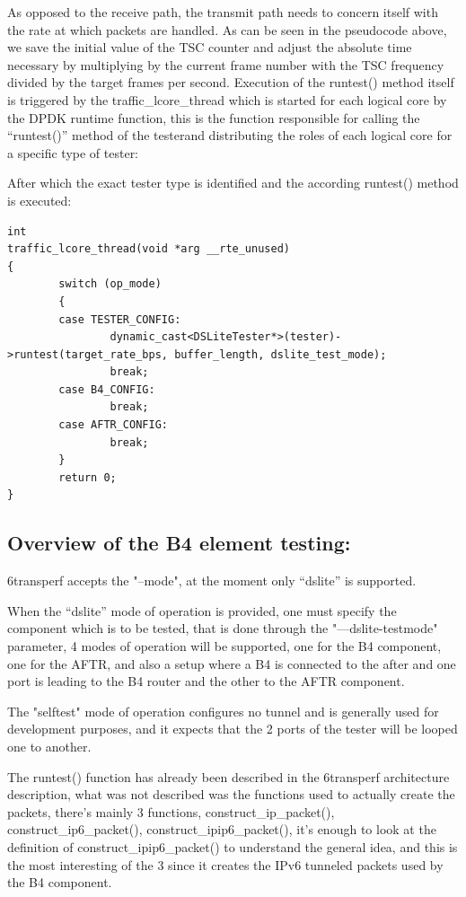 \documentclass[a4paper,12p]{article}
\begin{document}
	As opposed to the receive path, the transmit path needs to concern itself with the rate at which packets are handled. As can be seen in the pseudocode above, we save the initial value of the TSC counter and adjust the absolute time necessary by multiplying by the current frame number with the TSC frequency divided by the target frames per second.
	Execution of the runtest() method itself is triggered by the traffic\_lcore\_thread which is started for each logical core by the DPDK runtime function, this is the function responsible for calling the “runtest()” method of the testerand distributing the roles of each logical core for a specific type of tester:
 
After which the exact tester type is identified and the according runtest() method is executed:

\begin{lstlisting}
int
traffic_lcore_thread(void *arg __rte_unused)
{
        switch (op_mode)
        {
        case TESTER_CONFIG:
                dynamic_cast<DSLiteTester*>(tester)->runtest(target_rate_bps, buffer_length, dslite_test_mode);
                break;
        case B4_CONFIG:
                break;
        case AFTR_CONFIG:
                break;
        }
        return 0;
}
\end{lstlisting}

\subsection{Overview of the B4 element testing:}

6transperf accepts the "--mode", at the moment only “dslite” is supported.

When the “dslite” mode of operation is provided, one must specify the component which is to be tested, that is done through the "—dslite-testmode" parameter,  4 modes of operation will be supported, one for the B4 component, one for the AFTR, and also a setup where a B4 is connected to the after and one port is leading to the B4 router and the other to the AFTR component.

The "selftest" mode of operation configures no tunnel and is generally used for development purposes, and it expects that the 2 ports of the tester will be looped one to another.

The runtest() function has already been described in the 6transperf architecture description, what was not described was the functions used to actually create the packets, there’s mainly 3 functions, construct\_ip\_packet(), construct\_ip6\_packet(), construct\_ipip6\_packet(), it’s enough to look at the definition of construct\_ipip6\_packet() to understand the general idea, and this is the most interesting of the 3 since it creates the IPv6 tunneled packets used by the B4 component.
\end{document}
